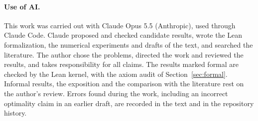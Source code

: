 \paragraph{Use of AI.}
This work was carried out with Claude Opus 5.5 (Anthropic), used through Claude Code. Claude proposed and checked
candidate results, wrote the Lean formalization, the numerical experiments and drafts of the text, and searched the
literature. The author chose the problems, directed the work and reviewed the results, and takes responsibility for
all claims. The results marked formal are checked by the Lean kernel, with the axiom audit of
Section~\ref{sec:formal}. Informal results, the exposition and the comparison with the literature rest on the
author's review. Errors found during the work, including an incorrect optimality claim in an earlier draft, are
recorded in the text and in the repository history.
